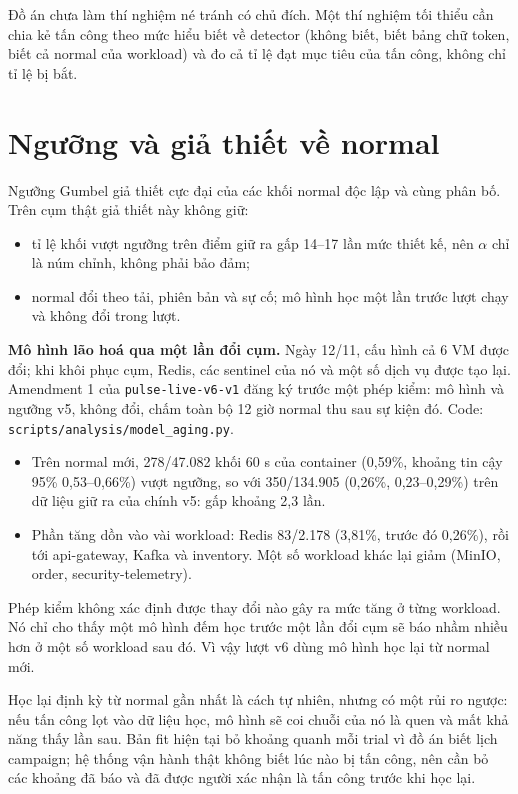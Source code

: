 Đồ án chưa làm thí nghiệm né tránh có chủ đích. Một thí nghiệm tối thiểu cần chia kẻ tấn công theo mức hiểu biết về detector (không biết, biết bảng chữ token, biết cả normal của workload) và đo cả tỉ lệ đạt mục tiêu của tấn công, không chỉ tỉ lệ bị bắt.

\section{Ngưỡng và giả thiết về normal}\label{sec:limits-threshold}

Ngưỡng Gumbel giả thiết cực đại của các khối normal độc lập và cùng phân bố. Trên cụm thật giả thiết này không giữ:

\begin{itemize}
\tightlist
\item
  tỉ lệ khối vượt ngưỡng trên điểm giữ ra gấp 14--17 lần mức thiết kế, nên $\alpha$ chỉ là núm chỉnh, không phải bảo đảm;
\item
  normal đổi theo tải, phiên bản và sự cố; mô hình học một lần trước lượt chạy và không đổi trong lượt.
\end{itemize}

\textbf{Mô hình lão hoá qua một lần đổi cụm.} Ngày 12/11, cấu hình cả 6 VM được đổi; khi khôi phục cụm, Redis, các sentinel của nó và một số dịch vụ được tạo lại. Amendment 1 của \texttt{pulse-\allowbreak{}live-\allowbreak{}v6-\allowbreak{}v1} đăng ký trước một phép kiểm: mô hình và ngưỡng v5, không đổi, chấm toàn bộ 12 giờ normal thu sau sự kiện đó. Code: \texttt{scripts/\allowbreak{}analysis/\allowbreak{}model\_\allowbreak{}aging.py}.
\begin{itemize}
\tightlist
\item
  Trên normal mới, 278/47.082 khối 60 s của container (0,59\%, khoảng tin cậy 95\% 0,53--0,66\%) vượt ngưỡng, so với 350/134.905 (0,26\%, 0,23--0,29\%) trên dữ liệu giữ ra của chính v5: gấp khoảng 2,3 lần.
\item
  Phần tăng dồn vào vài workload: Redis 83/2.178 (3,81\%, trước đó 0,26\%), rồi tới api-gateway, Kafka và inventory. Một số workload khác lại giảm (MinIO, order, security-telemetry).
\end{itemize}
Phép kiểm không xác định được thay đổi nào gây ra mức tăng ở từng workload. Nó chỉ cho thấy một mô hình đếm học trước một lần đổi cụm sẽ báo nhầm nhiều hơn ở một số workload sau đó. Vì vậy lượt v6 dùng mô hình học lại từ normal mới.

Học lại định kỳ từ normal gần nhất là cách tự nhiên, nhưng có một rủi ro ngược: nếu tấn công lọt vào dữ liệu học, mô hình sẽ coi chuỗi của nó là quen và mất khả năng thấy lần sau. Bản fit hiện tại bỏ khoảng quanh mỗi trial vì đồ án biết lịch campaign; hệ thống vận hành thật không biết lúc nào bị tấn công, nên cần bỏ các khoảng đã báo và đã được người xác nhận là tấn công trước khi học lại.

